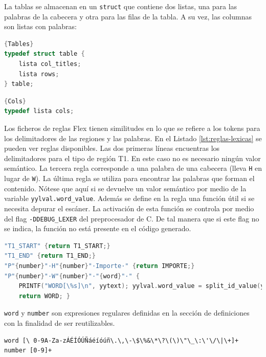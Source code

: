 La tablas se almacenan en un \verb|struct| que contiene dos listas, una para las palabras de la cabecera y otra para las filas de la tabla. A su vez, las columnas son listas con palabras:

\noindent\begin{minipage}{.45\textwidth}
    \begin{lstlisting}[language=C,caption={},frame=tlrb,label={}]{Tables}
typedef struct table {
    lista col_titles;
    lista rows;
} table;
    \end{lstlisting}
\end{minipage}\hfill
\begin{minipage}{.45\textwidth}
    \begin{lstlisting}[language=C,caption={},frame=tlrb,label={}]{Cols}
typedef lista cols;
    \end{lstlisting}
\end{minipage}

Los ficheros de reglas Flex tienen similitudes en lo que se refiere a los tokens para los delimitadores de las regiones y las palabras. En el Listado \ref{lst:reglas-lexicas} se pueden ver reglas disponibles. Las dos primeras líneas encuentras los delimitadores para el tipo de región T1. En este caso no es necesario ningún valor semántico. La tercera regla corresponde a una palabra de una cabecera (lleva \verb|H| en lugar de \verb|W|). La última regla se utiliza para encontrar las palabras que forman el contenido. Nótese que aquí si se devuelve un valor semántico por medio de la variable \verb|yylval.word_value|. Además se define en la regla una función útil si se necesita depurar el escáner. La activación de esta función se controla por medio del flag \verb|-DDEBUG_LEXER| del preprocesador de C. De tal manera que si este flag no se indica, la función no está presente en el código generado.

\begin{lstlisting}[language=C,caption={Reglas léxicas habituales},label={lst:reglas-lexicas}]
"T1_START" {return T1_START;}
"T1_END" {return T1_END;}
"P"{number}"·H"{number}"·Importe·" {return IMPORTE;}
"P"{number}"·W"{number}"·"{word}"·" {
    PRINTF("WORD[\%s]\n", yytext); yylval.word_value = split_id_value(yytext);
    return WORD; }
\end{lstlisting}

\verb|word| y \verb|number| son expresiones regulares definidas en la sección de definiciones con la finalidad de ser reutilizables.

\begin{lstlisting}[caption={Expresiones regulares para palabras y números},label={lst:word-and-number}]
word [\ 0-9A-Za-zÁÉÍÓÚÑáéíóúñ\.\,\-\$\%&\*\?\(\)\"\_\:\'\/\|\+]+
number [0-9]+
\end{lstlisting}

